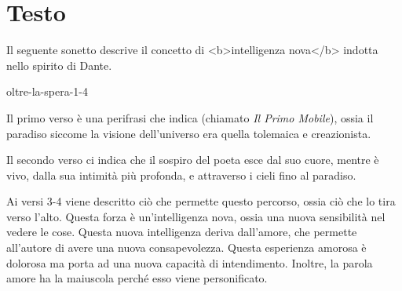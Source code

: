 \documentclass[preview]{standalone}
\begin{document}
\genpage

\section{Testo}

\begin{plainhtml}
    Il seguente sonetto descrive il concetto di <b>intelligenza nova</b>
    indotta nello spirito di Dante.
\end{plainhtml}

\begin{snippet}{oltre-la-spera-1-4}

    Il primo verso è una perifrasi che indica  (chiamato \textit{Il Primo Mobile}), ossia il paradiso
    siccome la visione dell'universo era quella tolemaica e creazionista.
    
    Il secondo verso ci indica che il sospiro del poeta esce dal suo cuore, mentre è vivo, dalla sua intimità più profonda,
    e attraverso i cieli fino al paradiso.  
    
    Ai versi 3-4 viene descritto ciò che permette questo percorso, ossia ciò che lo tira
    verso l'alto. Questa forza è un'intelligenza nova, ossia una nuova sensibilità nel vedere le cose.
    Questa nuova intelligenza deriva dall'amore, che permette all'autore di avere una nuova consapevolezza.
    Questa esperienza amorosa è dolorosa ma porta ad una nuova capacità di intendimento.
    Inoltre, la parola amore ha la maiuscola perché esso viene personificato.
\end{snippet}
\end{document}

